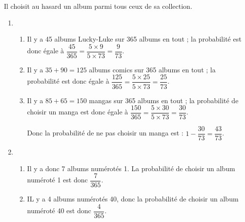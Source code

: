 
\medskip

%
%
 
Il choisit au hasard un album parmi tous ceux de sa collection.
\medskip

\begin{enumerate}
\item 
	\begin{enumerate}
		\item %
Il y a 45 albums \og Lucky-Luke\fg{} sur 365 albums en tout ; la probabilité est donc égale à $\dfrac{45}{365} = \dfrac{5 \times 9}{5 \times 73} = \dfrac{9}{73}$.
		\item %
Il y a $35 + 90 = 125$ albums comics sur 365 albums en tout ; la probabilité est donc égale à $\dfrac{125}{365} = \dfrac{5 \times 25}{5 \times 73} = \dfrac{25}{73}$.
		\item %
Il y a $85 + 65 = 150$ mangas sur 365 albums en tout ; la probabilité de choisir un manga est donc égale à $\dfrac{150}{365} = \dfrac{5 \times 30}{5 \times 73} = \dfrac{30}{73}$.

Donc la probabilité de ne pas choisir un manga est : $1 - \dfrac{30}{73} = \dfrac{43}{73}$.
	\end{enumerate}
\item %
	\begin{enumerate}
		\item %
Il y a donc 7 albums numérotés 1. La probabilité de choisir un album numéroté 1 est donc $\dfrac{7}{365}$.
		\item %
IL y a 4 albums numérotés 40, donc la probabilité de choisir un album numéroté 40 est donc $\dfrac{4}{365}$.
	\end{enumerate}
\end{enumerate}
\vspace{0.5cm}

